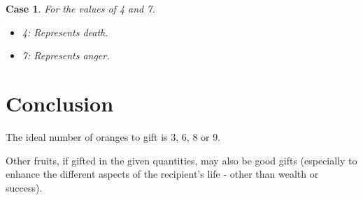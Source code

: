\documentclass[10pt,a4paper]{article}
\newtheorem{case}[theorem]{Case}
\begin{document}
\begin{case}
    For the values of 4 and 7.

    \begin{itemize}
        \item 4: Represents death.
        \item 7: Represents anger.
    \end{itemize}
\end{case}

\section{Conclusion}
The ideal number of oranges to gift is 3, 6, 8 or 9.

Other fruits, if gifted in the given quantities, may also be good gifts (especially to enhance the different aspects of the recipient's life - other than wealth or success).
\end{document}
